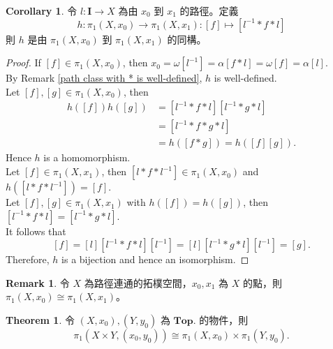 \documentclass[12pt]{article}
\theoremstyle{definition}
\newtheorem{theorem}[definition]{Theorem}
\newtheorem{remark}[definition]{Remark}
\newtheorem{corollary}[definition]{Corollary}
\newcommand\<{\langle}
\renewcommand\>{\rangle}
\begin{document}
\begin{CJK}{UTF8}{bsmi}
\begin{corollary}
\label{path define a isomorphism}
    令 $l:\textbf{I}\to X$ 為由 $x_0$ 到 $x_1$ 的路徑。定義
    \[
        h:\pi_1(X, x_0)\to\pi_1(X, x_1):[f]\mapsto[l^{-1}*f*l]
    \]
    則 $h$ 是由 $\pi_1(X, x_0)$ 到 $\pi_1(X, x_1)$ 的同構。
\end{corollary}
\begin{proof}
    If $[f]\in\pi_1(X, x_0)$, then $x_0=\omega[l^{-1}]=\alpha[f*l]=\omega[f]=\alpha[l]$. \\
    By Remark \ref{path class with * is well-defined}, $h$ is well-defined. \\
    Let $[f], [g]\in\pi_1(X, x_0)$, then 
    \begin{align*}
        h([f])h([g])
        & = [l^{-1}*f*l][l^{-1}*g*l] \\
        & = [l^{-1}*f*g*l] \\
        & = h([f*g])
          = h([f][g]).
    \end{align*}
    Hence $h$ is a homomorphism. \\
    Let $[f]\in\pi_1(X, x_1)$, then $[l*f*l^{-1}]\in\pi_1(X, x_0)$ and $h([l*f*l^{-1}])=[f]$. \\
    Let $[f], [g]\in\pi_1(X, x_1)$ with $h([f])=h([g])$, then $[l^{-1}*f*l]=[l^{-1}*g*l]$. \\
    It follows that
    \[
        [f]=[l][l^{-1}*f*l][l^{-1}]=[l][l^{-1}*g*l][l^{-1}]=[g].
    \]
    Therefore, $h$ is a bijection and hence an isomorphism.
\end{proof}

\begin{remark}
    令 $X$ 為路徑連通的拓樸空間，$x_0, x_1$ 為 $X$ 的點，則 $\pi_1(X, x_0)\cong\pi_1(X, x_1)$。
\end{remark}

\begin{theorem}
    令 $(X, x_0), (Y, y_0)$ 為 $\textbf{Top.}$ 的物件，則 
    \[
        \pi_1(X\times Y, (x_0, y_0))\cong\pi_1(X, x_0)\times\pi_1(Y, y_0).
    \]
\end{theorem}


\end{CJK}
\end{document}
